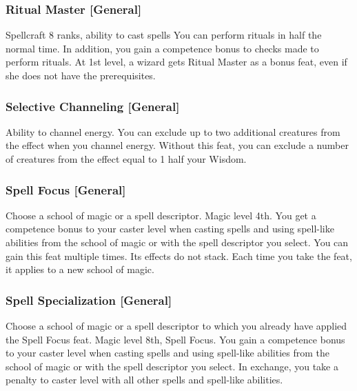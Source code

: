 \subsubsection{Ritual Master [General]}
 Spellcraft 8 ranks, ability to cast spells
 You can perform rituals in half the normal time. In addition, you gain a  competence bonus to checks made to perform rituals.
 At 1st level, a wizard gets Ritual Master as a bonus feat, even if she does not have the prerequisites.

\subsubsection{Selective Channeling [General]}
 Ability to channel energy.
 You can exclude up to two additional creatures from the effect when you channel energy.
 Without this feat, you can exclude a number of creatures from the effect equal to 1 \add half your Wisdom.

\subsubsection{Spell Focus [General]}
Choose a school of magic or a spell descriptor.
 Magic level 4th.
 You get a  competence bonus to your caster level when casting spells and using spell-like abilities from the school of magic or with the spell descriptor you select.
 You can gain this feat multiple times. Its effects do not stack. Each time you take the feat, it applies to a new school of magic.

\subsubsection{Spell Specialization [General]}
Choose a school of magic or a spell descriptor to which you already have applied the Spell Focus feat.
\featpre Magic level 8th, Spell Focus.
\featben You gain a  competence bonus to your caster level when casting spells and using spell-like abilities from the school of magic or with the spell descriptor you select. In exchange, you take a  penalty to caster level with all other spells and spell-like abilities.


